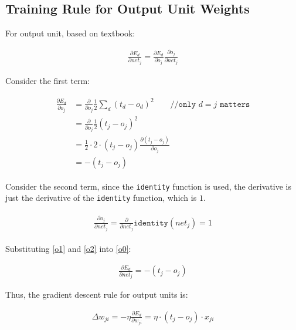\documentclass[preview]{standalone}
\begin{document}
\section{}

\subsection{Training Rule for Output Unit Weights}
For output unit, based on textbook:

\begin{align}
\label{o0}
\frac{\partial E_d}{\partial net_j}=\frac{\partial E_d}{\partial o_j}\frac{\partial o_j}{\partial net_j}
\end{align}

Consider the first term:

\begin{align}
\label{o1}
\begin{split}
\frac{\partial E_d}{\partial o_j}
&=\frac{\partial}{\partial o_j}\frac{1}{2}\sum_d(t_d-o_d)^2\qquad\texttt{//only $d = j$ matters}\\
&=\frac{\partial}{\partial o_j}\frac{1}{2}(t_j-o_j)^2\\
&=\frac{1}{2} \cdot 2 \cdot (t_j-o_j)\frac{\partial(t_j-o_j)}{\partial o_j}\\
&=-(t_j-o_j)
\end{split}
\end{align}

Consider the second term, since the \texttt{identity} function is used, the
derivative is just the derivative of the \texttt{identity} function, which is
$1$.

\begin{align}
\label{o2}
\begin{split}
\frac{\partial o_j}{\partial net_j}=\frac{\partial}{\partial net_j}\mathtt{identity}(net_j) = 1
\end{split}
\end{align}

Substituting \cref{o1} and \cref{o2} into \cref{o0}:

\begin{align}
    \frac{\partial E_d}{\partial net_j}=-(t_j-o_j)
\end{align}

Thus, the gradient descent rule for output units is:

\begin{align}
\Delta w_{ji} = -\eta\frac{\partial E_d}{\partial w_{ji}} = \eta \cdot
(t_j-o_j) \cdot x_{ji}
\end{align}
\end{document}
